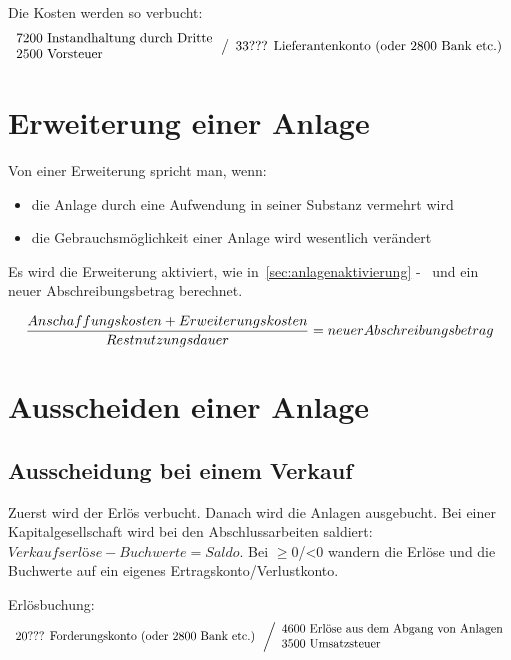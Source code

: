 \documentclass[a4paper,9pt]{article}
\begin{document}
Die Kosten werden so verbucht:
\begin{equation*}
  \begin{array}{l}
    \text{7200 Instandhaltung durch
Dritte}\\
     \text{2500 Vorsteuer}\\
  \end{array}
  \left\slash
    \begin{array}{l}
      \text{33??? Lieferantenkonto (oder 2800 Bank etc.)}\\
    \end{array}
  \right.
\end{equation*}

\section{Erweiterung einer Anlage}
Von einer Erweiterung spricht man, wenn:
\begin{itemize}
  \item die Anlage durch eine Aufwendung in seiner Substanz vermehrt wird
  \item die Gebrauchsmöglichkeit einer Anlage wird wesentlich verändert
\end{itemize}

Es wird die Erweiterung aktiviert, wie
in~\autoref{sec:anlagenaktivierung} -~
und ein neuer Abschreibungsbetrag berechnet.

\begin{equation}
  { {Anschaffungskosten + Erweiterungskosten } \over Restnutzungsdauer
  } = neuer Abschreibungsbetrag
\end{equation}

\section{Ausscheiden einer Anlage}
\subsection{Ausscheidung bei einem Verkauf}
\label{subsec:verkauf}
Zuerst wird der Erlös verbucht. Danach wird die Anlagen
ausgebucht. Bei einer Kapitalgesellschaft wird bei den
Abschlussarbeiten saldiert: $ \textit{Verkaufserlöse} - Buchwerte = Saldo$. Bei
$\geq 0$/<0 wandern die Erlöse und die Buchwerte auf ein eigenes
Ertragskonto/Verlustkonto.

Erlösbuchung:
\begin{equation*}
  \begin{array}{l}
    \text{20??? Forderungskonto (oder 2800 Bank etc.)}\\
  \end{array}
  \left\slash
    \begin{array}{l}
      \text{4600 Erlöse aus dem Abgang von Anlagen}\\
      \text{3500 Umsatzsteuer}\\
    \end{array}
  \right.
\end{equation*}
\end{document}
